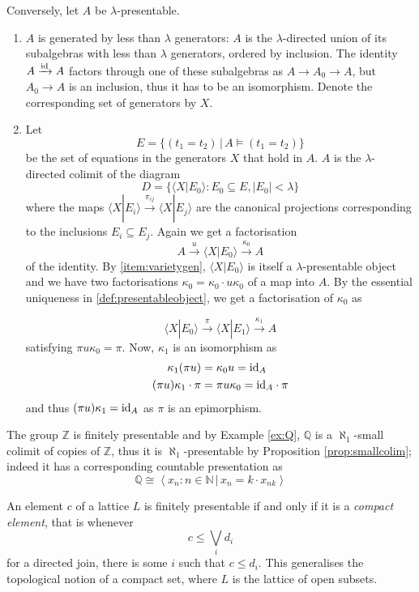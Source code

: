 Conversely, let $A$ be $\lambda$-presentable.
\begin{enumerate}
\item \label{item:varietygen} $A$ is generated by less than $\lambda$ generators: $A$ is the $\lambda$-directed union of its subalgebras with less than $\lambda$ generators, ordered by inclusion. The identity $A \xrightarrow{\textrm{id}} A$ factors through one of these subalgebras as $A \to A_0 \to A$, but $A_0 \to A$ is an inclusion, thus it has to be an isomorphism. Denote the corresponding set of generators by $X$.
\item Let \[ E = \{ (t_1 = t_2) \,|\, A \models (t_1 = t_2) \} \] be the set of equations in the generators $X$ that hold in $A$. $A$ is the $\lambda$-directed colimit of the diagram
\[ D = \{ \langle X|E_0\rangle : E_0 \subseteq E, |E_0| < \lambda \} \]
where the maps $\langle X|E_i\rangle \xrightarrow{\pi_{ij}} \langle X|E_j\rangle$ are the canonical projections corresponding to the inclusions $E_i \subseteq E_j$. Again we get a factorisation 
\[ A \xrightarrow{u} \langle X|E_0 \rangle \xrightarrow{\kappa_0} A \]
of the identity. By \ref{item:varietygen}, $\langle X|E_0 \rangle$ is itself a $\lambda$-presentable object and we have two factorisations $\kappa_0 = \kappa_0 \cdot u\kappa_0$ of a map into $A$. By the essential uniqueness in \ref{def:presentableobject}, we get a factorisation of $\kappa_0$ as

\[ \langle X|E_0 \rangle \xrightarrow{\pi} \langle X|E_1 \rangle \xrightarrow{\kappa_1} A \] satisfying $\pi u \kappa_0 = \pi$. Now, $\kappa_1$ is an isomorphism as
\begin{align*}
\kappa_1 (\pi u) &= \kappa_0 u = \textrm{id}_A \\
(\pi u) \kappa_1 \cdot \pi &= \pi u \kappa_0 = \textrm{id}_A \cdot \pi
\end{align*}
and thus $(\pi u) \kappa_1 = \textrm{id}_A$ as $\pi$ is an epimorphism.
\end{enumerate}

\begin{Example}
The group $\mathbb Z$ is finitely presentable and by Example \ref{ex:Q}, $\mathbb Q$ is a $\aleph_1$-small colimit of copies of $\mathbb Z$, thus it is $\aleph_1$-presentable by Proposition \ref{prop:smallcolim}; indeed it has a corresponding countable presentation as
\[ \mathbb Q \cong \left\langle x_n : n \in \mathbb N\,|\,x_n = k \cdot x_{nk} \right \rangle\]
\end{Example}

\begin{Example}
An element $c$ of a lattice $L$ is finitely presentable if and only if it is a \emph{compact element}, that is whenever
\[ c \leq \bigvee_i d_i \]
for a directed join, there is some $i$ such that $c \leq d_i$. This generalises the topological notion of a compact set, where $L$ is the lattice of open subsets.
\end{Example}


